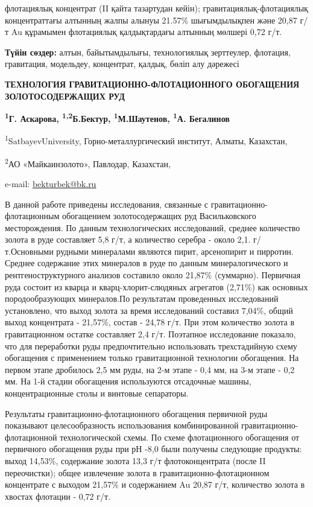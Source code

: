 флотациялық концентрат (II қайта тазартудан кейін);
гравитациялық-флотациялық концентраттағы алтынның жалпы алынуы 21.57\%
шығымдылықпен және 20,87 г/т Au құрамымен флотациялық қалдықтардағы
алтынның мөлшері 0,72 г/т.

{\bfseries Түйін сөздер:} алтын, байытымдылығы, технологиялық зерттеулер,
флотация, гравитация, модельдеу, концентрат, қалдық, бөліп алу дәрежесі

{\bfseries ТЕХНОЛОГИЯ ГРАВИТАЦИОННО-ФЛОТАЦИОННОГО ОБОГАЩЕНИЯ
ЗОЛОТОСОДЕРЖАЩИХ РУД}

{\bfseries \textsuperscript{1}Г. Аскарова,
\textsuperscript{1,2}Б.Бектур\textsuperscript{\envelope },
\textsuperscript{1}М.Шаутенов, \textsuperscript{1}А. Бегалинов}

\textsuperscript{1}SatbayevUniversity, Горно-металлургический институт,
Алматы, Казахстан,

\textsuperscript{2}АО «Майкаинзолото», Павлодар, Казахстан,

e-mail: \href{mailto:bekturbek@bk.run}{bekturbek@bk.ru}

В данной работе приведены исследования, связанные с
гравитационно-флотационным обогащением золотосодержащих руд
Васильковского месторождения. По данным технологических исследований,
среднее количество золота в руде составляет 5,8 г/т, а количество
серебра - около 2,1. г/т.Основными рудными минералами являются пирит,
арсенопирит и пирротин. Среднее содержание этих минералов в руде по
данным минералогического и рентгеноструктурного анализов составило около
21,87\% (суммарно). Первичная руда состоит из кварца и
кварц-хлорит-слюдяных агрегатов (2,71\%) как основных породообразующих
минералов.По результатам проведенных исследований установлено, что выход
золота за время исследований составил 7,04\%, общий выход концентрата -
21,57\%, состав - 24,78 г/т. При этом количество золота в гравитационном
остатке составляет 2,4 г/т. Поэтапное исследование показало, что для
переработки руды предпочтительно использовать трехстадийную схему
обогащения с применением только гравитационной технологии обогащения. На
первом этапе дробилось 2,5 мм руды, на 2-м этапе - 0,4 мм, на 3-м этапе
- 0,2 мм. На 1-й стадии обогащения используются отсадочные машины,
концентрационные столы и винтовые сепараторы.

Результаты гравитационно-флотационного обогащения первичной руды
показывают целесообразность использования комбинированной
гравитационно-флотационной технологической схемы. По схеме флотационного
обогащения от первичного обогащения руды при рН -8,0 были получены
следующие продукты: выход 14,53\%, содержание золота 13,3 г/т
флотоконцентрата (после II переочистки); общее извлечение золота в
гравитационно-флотационном концентрате с выходом 21,57\% и содержанием
Au 20,87 г/т, количество золота в хвостах флотации - 0,72 г/т.


